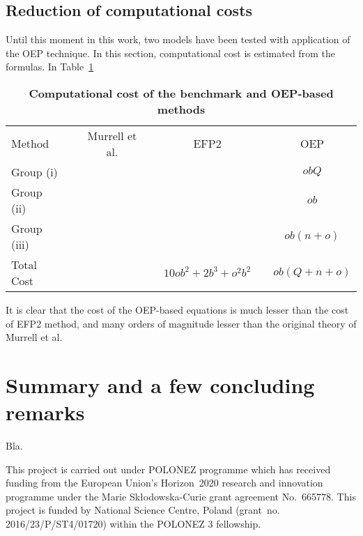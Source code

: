 \subsection{\label{s:413s6}Reduction of computational costs}

Until this moment in this work, two models have been tested with application of the OEP technique.
In this section, computational cost is estimated from the formulas.
In
Table~\ref{t:oep-costs} 
%
{
\renewcommand{\arraystretch}{1.4}
\begin{table}[b]
\caption[Computational cost of the benchmark and OEP-based methods: calculation of coupling constant]
{{\bf Computational cost of the benchmark and OEP-based methods\footnotemark[1]}
}
\label{t:oep-costs}
\begin{ruledtabular}
\begin{tabular}{lcccccc}
Method             && Murrell et al. &&    EFP2        &&      OEP     \\ 
	\cline{1-7}
Group (i)         &&  &&        &&   $obQ$     \\
Group (ii)        &&  &&        &&   $ob$      \\
Group (iii)       &&  &&        &&   $ob(n+o)$     \\
Total Cost        &&  && $10ob^2 + 2b^3 + o^2b^2$       &&   $ob(Q+n+o)$     \\
\end{tabular}
\end{ruledtabular}
%
%
\end{table}
}
%
It is clear that the cost of the OEP\hyp{}based equations is much lesser than the cost of EFP2 method,
and many orders of magnitude lesser than the original theory of Murrell et al.


\section{\label{s:6}Summary and a few concluding remarks}

Bla.

\begin{acknowledgments}
This project is carried out under POLONEZ programme which has received funding from the European Union's
Horizon~2020 research and innovation programme under the Marie Skłodowska-Curie grant agreement 
No.~665778. This project is funded by National Science Centre, Poland 
(grant~no. 2016/23/P/ST4/01720) within the POLONEZ 3 fellowship.
\end{acknowledgments}

